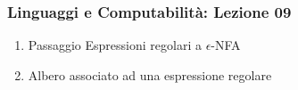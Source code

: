 




\begin{frame}[fragile]
	\frametitle{Linguaggi e Computabilità: Lezione 09}
\begin{enumerate}
\item
Passaggio Espressioni regolari a $\epsilon$-NFA
\item
Albero associato ad una espressione regolare
\end{enumerate}
\end{frame}



